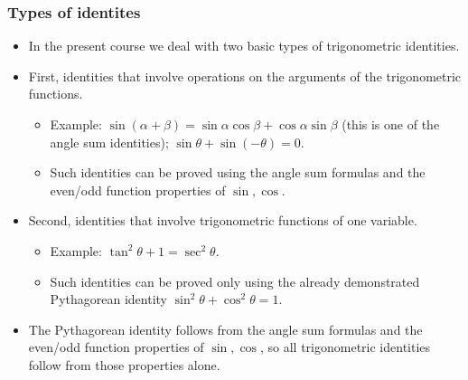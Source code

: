 \begin{frame}
\frametitle{Types of identites}
\begin{itemize}
\item In the present course we deal with two basic types of trigonometric identities.
\item First, identities that involve operations on the arguments of the trigonometric functions.
\begin{itemize}
\item Example: $\sin(\alpha+\beta)=\sin \alpha\cos \beta+ \cos\alpha\sin\beta $ (this is one of the angle sum identities); $\sin \theta+\sin(-\theta)=0$.
\item Such identities can be proved using the angle sum formulas and the even/odd function properties of $\sin,\cos$.
\end{itemize}
\item Second, identities that involve trigonometric functions of one variable.
\begin{itemize}
\item Example: $\tan^2\theta +1=\sec^2\theta$. 
\item Such identities can be proved only using the already demonstrated Pythagorean identity $\sin^2\theta +\cos^2\theta=1$. 
\end{itemize}
\item The Pythagorean identity follows from the angle sum formulas and the even/odd function properties of $\sin,\cos$, so all trigonometric identities follow from those properties alone.
\end{itemize}
\end{frame}